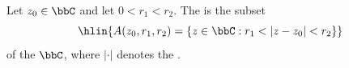 \begin{definition} \label{definition:annulus_in_the_complex_plane}
Let $z_0 \in \bbC$ and let $0 < r_1 < r_2$.
The  is the subset
$$\hlin{A(z_0, r_1, r_2) = \{z \in \bbC : r_1 < |z - z_0| < r_2\}}$$
of the  $\bbC$, where $|\cdot|$ denotes the .
\end{definition}